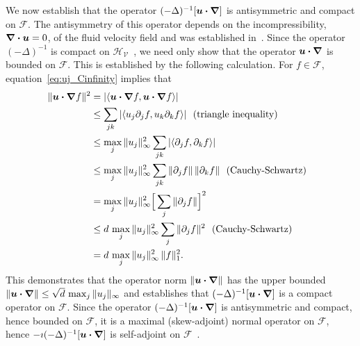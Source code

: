 \documentclass[leqno,onefignum,onetabnum]{siamltex1213}
\newcommand{\Vc}{\mathcal{V}}
\newcommand{\Hs}{\mathscr{H}}
\newcommand{\Fs}{\mathscr{F}}
\newcommand\bnabla{\mbox{\boldmath${\nabla}$}}
\providecommand\bcdot{\boldsymbol{\cdot}}
\newcommand{\vecu}{\boldsymbol{u}}
\begin{document}
We now establish that the operator $(-\Delta)^{-1}[\vecu\bcdot\bnabla]$
is antisymmetric and compact on $\Fs$. The antisymmetry of this
operator depends on the incompressibility, $\bnabla\bcdot\vecu=0$, of
the fluid velocity field and was established
in~\cite{Bhattacharya:AAP:1999:951,Pavliotis:PHD_Thesis}. 
Since the operator $(-\Delta)^{-1}$ is
compact on $\Hs_{\Vc}$~\cite{Stakgold:BVP:2000}, we need only show
that the operator $\vecu\bcdot\bnabla$ is bounded on $\Fs$. This is
established by the following calculation. For $f\in\Fs$, equation~\eqref{eq:uj_Cinfinity} 
implies that
%
\begin{align}\label{eq:Second_Bound_A}
  \|\vecu\bcdot\bnabla f\|^2&=|\langle\vecu\bcdot\bnabla f,\vecu\bcdot\bnabla f\rangle| 
         \\
         &\leq\sum_{jk}|\langle u_j\partial_jf,u_k\partial_kf\rangle |~\text{ (triangle inequality) }
         \notag\\
         &\leq\max_j\|u_j\|_\infty^2\sum_{jk}|\langle\partial_jf,\partial_kf\rangle|
         \notag\\
         &\leq\max_j\|u_j\|_\infty^2\sum_{jk}\|\partial_jf\|\,\|\partial_kf\|
              ~\text{ (Cauchy-Schwartz) }~
         \notag\\
         &=\max_j\|u_j\|_\infty^2\Big[\sum_{j}\|\partial_jf\|\Big]^2
         \notag\\
         &\leq d\,\max_j\|u_j\|_\infty^2\sum_{j}\|\partial_jf\|^2
         ~\text{ (Cauchy-Schwartz) }~
         \notag\\
         &=d\,\max_j\|u_j\|_\infty^2\,\|f\|_1^2.
         \notag
\end{align}
%
This demonstrates that the operator norm $\|\vecu\bcdot\bnabla\|$ has
the upper bounded $\|\vecu\bcdot\bnabla\|\leq\sqrt{d}\,\max_j\|u_j\|_\infty$ and
establishes that $(-\Delta)^{-1}[\vecu\bcdot\bnabla]$ is a compact operator
on $\Fs$. Since the operator $(-\Delta)^{-1}[\vecu\bcdot\bnabla]$ is
antisymmetric and compact, hence bounded on $\Fs$, it is a maximal (skew-adjoint)
normal operator on $\Fs$, hence $-\imath(-\Delta)^{-1}[\vecu\bcdot\bnabla]$ is
self-adjoint on $\Fs$~\cite{Stone:64}.
\end{document}
